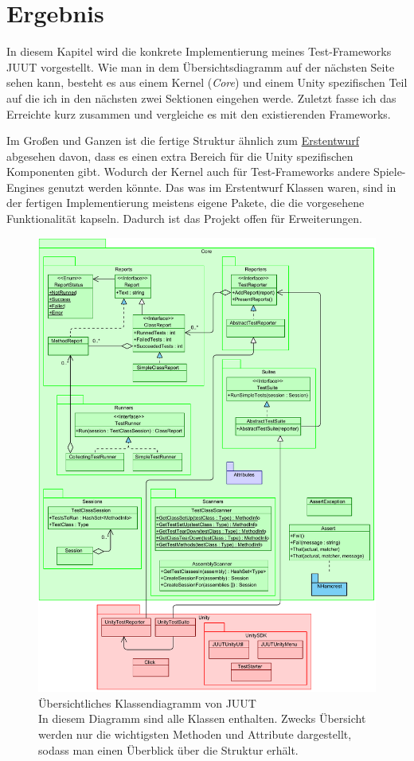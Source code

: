 \chapter{Ergebnis}

In diesem Kapitel wird die konkrete Implementierung meines Test-Frameworks JUUT vorgestellt. Wie man in dem Übersichtsdiagramm auf der nächsten Seite sehen kann, besteht es aus einem Kernel (\textit{Core}) und einem Unity spezifischen Teil auf die ich in den nächsten zwei Sektionen eingehen werde. Zuletzt fasse ich das Erreichte kurz zusammen und vergleiche es mit den existierenden Frameworks.

Im Großen und Ganzen ist die fertige Struktur ähnlich zum \hyperref[fig:WalkingSkeleton]{Erstentwurf} abgesehen davon, dass es einen extra Bereich für die Unity spezifischen Komponenten gibt. Wodurch der Kernel auch für Test-Frameworks andere Spiele-Engines genutzt werden könnte. Das was im Erstentwurf Klassen waren, sind in der fertigen Implementierung meistens eigene Pakete, die die vorgesehene Funktionalität kapseln. Dadurch ist das Projekt offen für Erweiterungen.

\clearpage
\begin{figure}
\centering
\includegraphics[width=0.9\linewidth]{images/Kapitel_Ergebnis/Overview}
\caption[Übersichtliches Klassendiagramm von JUUT]{Übersichtliches Klassendiagramm von JUUT\\
In diesem Diagramm sind alle Klassen enthalten. Zwecks Übersicht werden nur die wichtigsten Methoden und Attribute dargestellt, sodass man einen Überblick über die Struktur erhält.}
\label{fig:Overview}
\end{figure}
\clearpage

